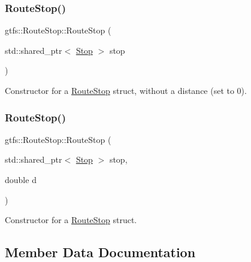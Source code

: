 \subsubsection{\texorpdfstring{Route\+Stop()}{RouteStop()}\hspace{0.1cm}{\footnotesize\ttfamily [1/2]}}
{\footnotesize\ttfamily gtfs\+::\+Route\+Stop\+::\+Route\+Stop (\begin{DoxyParamCaption}\item[{std\+::shared\+\_\+ptr$<$ \hyperlink{classgtfs_1_1Stop}{Stop} $>$}]{stop }\end{DoxyParamCaption})\hspace{0.3cm}{\ttfamily [inline]}}

Constructor for a \hyperlink{structgtfs_1_1RouteStop}{Route\+Stop} struct, without a distance (set to 0). \mbox{\label{structgtfs_1_1RouteStop_a5f3dba72665e9731bad7a844bee4a949}} 
\subsubsection{\texorpdfstring{Route\+Stop()}{RouteStop()}\hspace{0.1cm}{\footnotesize\ttfamily [2/2]}}
{\footnotesize\ttfamily gtfs\+::\+Route\+Stop\+::\+Route\+Stop (\begin{DoxyParamCaption}\item[{std\+::shared\+\_\+ptr$<$ \hyperlink{classgtfs_1_1Stop}{Stop} $>$}]{stop,  }\item[{double}]{d }\end{DoxyParamCaption})\hspace{0.3cm}{\ttfamily [inline]}}

Constructor for a \hyperlink{structgtfs_1_1RouteStop}{Route\+Stop} struct. 

\subsection{Member Data Documentation}
\mbox{\label{structgtfs_1_1RouteStop_ab738c008a00eab17953ab124a86ca207}} 
